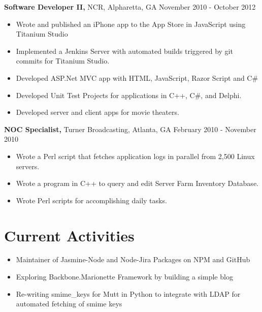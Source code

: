 \documentclass[margin]{res}
\begin{document}
\begin{resume}
    {\bf Software Developer II,} NCR, Alpharetta, GA \hfill November 2010 - October
    2012
        \begin{itemize} \itemsep -2pt
            \item Wrote and published an iPhone app to the App Store in JavaScript
                using Titanium Studio
            \item Implemented a Jenkins Server with automated builds triggered by
                git commits for Titanium Studio. 
            \item Developed ASP.Net MVC app with HTML, JavaScript, Razor Script and
                C\# 
            \item Developed Unit Test Projects for applications in C++, C\#, and
                Delphi.
            \item Developed server and client apps for movie theaters.
        \end{itemize}

    {\bf NOC Specialist,} Turner Broadcasting, Atlanta, GA \hfill February 2010 -
    November 2010
        \begin{itemize} \itemsep -2pt
            \item Wrote a Perl script that fetches application logs in parallel
                from 2,500 Linux servers.
            \item Wrote a program in C++ to query and edit Server Farm Inventory
                Database.
            \item Wrote Perl scripts for accomplishing daily tasks.
        \end{itemize}

\section{Current Activities}
    \begin{itemize}
        \item Maintainer of Jasmine-Node and Node-Jira Packages on NPM and GitHub
        \item Exploring Backbone.Marionette Framework by building a simple blog
        \item Re-writing smime\_keys for Mutt in Python to integrate with LDAP
            for automated fetching of smime keys
    \end{itemize}

\end{resume} 
\end{document}
